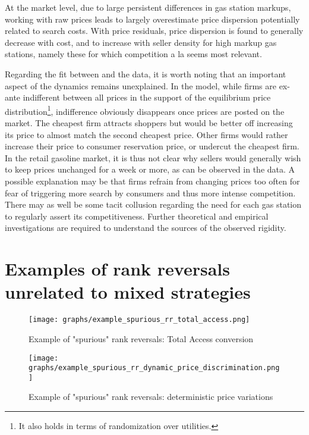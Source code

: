 \documentclass[english]{article}
\begin{document}
At the market level, due to large persistent differences in gas station markups, working with raw prices leads to largely overestimate price dispersion potentially related to search costs. With price residuals, price dispersion is found to generally decrease with cost, and to increase with seller density for high markup gas stations, namely these for which competition a la \cite{VAR80} seems most relevant.

Regarding the fit between \cite{VAR80} and the data, it is worth noting that an important aspect of the dynamics remains unexplained. In the model, while firms are ex-ante indifferent between all prices in the support of the equilibrium price distribution\footnote{It also holds in terms of randomization over utilities.}, indifference obviously disappears once prices are posted on the market. The cheapest firm attracts shoppers but would be better off increasing its price to almost match the second cheapest price. Other firms would rather increase their price to consumer reservation price, or undercut the cheapest firm. In the retail gasoline market, it is thus not clear why sellers would generally wish to keep prices unchanged for a week or more, as can be observed in the data. A possible explanation may be that firms refrain from changing prices too often for fear of triggering more search by consumers and thus more intense competition. There may as well be some tacit collusion regarding the need for each gas station to regularly assert its competitiveness. Further theoretical and empirical investigations are required to understand the sources of the observed rigidity.

\newpage



\appendix

\section{Examples of rank reversals unrelated to mixed strategies}

\begin{figure}[htb!]
    \caption{Example of "spurious" rank reversals: Total Access conversion}
	\centering
		\texttt{[image: graphs/example\_spurious\_rr\_total\_access.png]}
\label{fig:rr_total_access}
\end{figure}

\begin{figure}[htb!]
    \caption{Example of "spurious" rank reversals: deterministic price variations}
	\centering
\texttt{[image: graphs/example\_spurious\_rr\_dynamic\_price\_discrimination.png]}
\label{fig:rr_dynamic_price_discrimination}
\end{figure}
\end{document}
